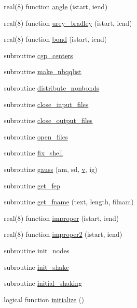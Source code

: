 \begin{DoxyCompactItemize}
\item 
real(8) function \hyperlink{classmd_a0733a4f55d8b37d4791c0effcfbea36c}{angle} (istart, iend)
\item 
real(8) function \hyperlink{classmd_abffb97b9972f882b68c27259e1fa5f8e}{urey\-\_\-bradley} (istart, iend)
\item 
real(8) function \hyperlink{classmd_a677ce4371ed79a4dd96c8ed2f3ab6956}{bond} (istart, iend)
\item 
subroutine \hyperlink{classmd_a569f1efff75d7a9816131516f01a3547}{cgp\-\_\-centers}
\item 
subroutine \hyperlink{classmd_a236a0824bcdbad217f25a45e51a2f14f}{make\-\_\-nbqqlist}
\item 
subroutine \hyperlink{classmd_a71b05091cbb717fac0643ab4d39dfd6c}{distribute\-\_\-nonbonds}
\item 
subroutine \hyperlink{classmd_a2d6b73138e5aa837cfe9822855503487}{close\-\_\-input\-\_\-files}
\item 
subroutine \hyperlink{classmd_a5bd74b9ed60f4d0515416e77a9dcb825}{close\-\_\-output\-\_\-files}
\item 
subroutine \hyperlink{classmd_abd4ec16cd201e7392a70d28bfecca076}{open\-\_\-files}
\item 
subroutine \hyperlink{classmd_a220c7a7f13a38bdc2d5eabec5812b6d8}{fix\-\_\-shell}
\item 
subroutine \hyperlink{classmd_ad5c98093b438b222e924abf03cea7ff4}{gauss} (am, sd, \hyperlink{classmd_a0eb489f64d496d6a73efa40b03d7a7ac}{v}, ig)
\item 
subroutine \hyperlink{classmd_a07ecde439edb4c485493261c2f3b3b7b}{get\-\_\-fep}
\item 
subroutine \hyperlink{classmd_a013765d9269cd11215d44783496e5bfd}{get\-\_\-fname} (text, length, filnam)
\item 
real(8) function \hyperlink{classmd_a0a01ffa064aa9d775b0fae80439404d1}{improper} (istart, iend)
\item 
real(8) function \hyperlink{classmd_a6a44b5b4e7119c4e8cb66815163fe66b}{improper2} (istart, iend)
\item 
subroutine \hyperlink{classmd_ac261f29b5f6b6fbfa764b73a4516ac02}{init\-\_\-nodes}
\item 
subroutine \hyperlink{classmd_af498e436cb9b94fa685a4aecfbadc3e1}{init\-\_\-shake}
\item 
subroutine \hyperlink{classmd_ae8be0dd848ca05bfe4f1a70a690acba3}{initial\-\_\-shaking}
\item 
logical function \hyperlink{classmd_acecdfbb85340e13040d34a2544d7c4c5}{initialize} ()

\end{DoxyCompactItemize}
